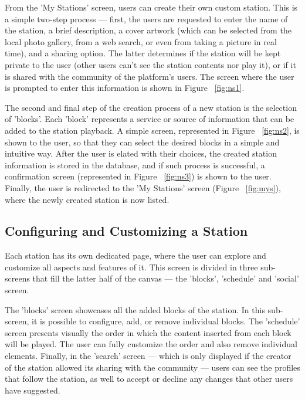 From the 'My Stations' screen, users can create their own custom station. This is a simple two-step process  — first, the users are requested to enter the name of the station, a brief description, a cover artwork (which can be selected from the local photo gallery, from a web search, or even from taking a picture in real time), and a sharing option. The latter determines if the station will be kept private to the user (other users can't see the station contents nor play it), or if it is shared with the community of the platform's users. The screen where the user is prompted to enter this information is shown in Figure ~\ref{fig:ns1}.

The second and final step of the creation process of a new station is the selection of 'blocks'. Each 'block' represents a service or source of information that can be added to the station playback. A simple screen, represented in Figure ~\ref{fig:ns2}, is shown to the user, so that they can select the desired blocks in a simple and intuitive way. After the user is elated with their choices, the created station information is stored in the database, and if such process is successful, a confirmation screen  (represented in Figure ~\ref{fig:ns3}) is shown to the user. Finally, the user is redirected to the 'My Stations' screen (Figure ~\ref{fig:mys}), where the newly created station is now listed.

\subsection{Configuring and Customizing a Station}


Each station has its own dedicated page, where the user can explore and customize all aspects and features of it. This screen is divided in three sub-screens that fill the latter half of the canvas — the 'blocks', 'schedule' and 'social' screen.

The 'blocks' screen showcases all the added blocks of the station. In this sub-screen, it is possible to configure, add, or remove individual blocks. The 'schedule' screen presents visually the order in which the content inserted from each block will be played. The user can fully customize the order and also remove individual elements. Finally, in the 'search' screen — which is only displayed if the creator of the station allowed its sharing with the community — users can see the profiles that follow the station, as well to accept or decline any changes that other users have suggested.

